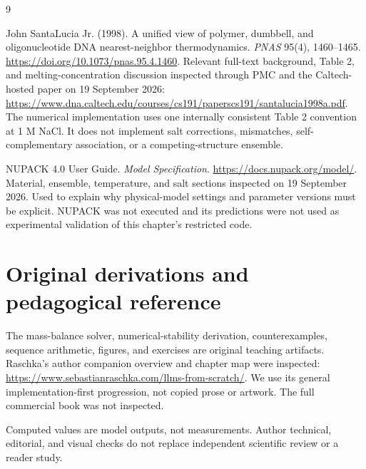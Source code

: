 \renewcommand{\bibname}{Sources and reading notes}
\begin{thebibliography}{9}
John SantaLucia Jr. (1998). A unified view of polymer, dumbbell, and
oligonucleotide DNA nearest-neighbor thermodynamics.
\emph{PNAS} 95(4), 1460--1465.
\url{https://doi.org/10.1073/pnas.95.4.1460}.
Relevant full-text background, Table 2, and melting-concentration discussion
inspected through PMC and the Caltech-hosted paper on 19 September 2026:
\url{https://www.dna.caltech.edu/courses/cs191/paperscs191/santalucia1998a.pdf}.
The numerical implementation uses one internally consistent Table 2
convention at 1 M NaCl. It does not implement salt corrections, mismatches,
self-complementary association, or a competing-structure ensemble.

NUPACK 4.0 User Guide. \emph{Model Specification}.
\url{https://docs.nupack.org/model/}.
Material, ensemble, temperature, and salt sections inspected on
19 September 2026. Used to explain why physical-model settings and parameter
versions must be explicit. NUPACK was not executed and its predictions were
not used as experimental validation of this chapter's restricted code.
\end{thebibliography}

\section*{Original derivations and pedagogical reference}
The mass-balance solver, numerical-stability derivation, counterexamples,
sequence arithmetic, figures, and exercises are original teaching artifacts.
Raschka's author companion overview and chapter map were inspected:
\url{https://www.sebastianraschka.com/llms-from-scratch/}.
We use its general implementation-first progression, not copied prose or
artwork. The full commercial book was not inspected.

Computed values are model outputs, not measurements. Author technical,
editorial, and visual checks do not replace independent scientific review
or a reader study.
